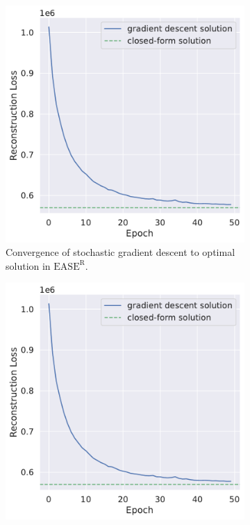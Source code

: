 \documentclass{article}
\newcommand{\easer}{$\text{EASE}^\text{R}$}
\begin{document}
\begin{figure}[h]
	\centering
	\begin{subfigure}[b]{0.3\textwidth}
		\centering
		\includegraphics[width=\textwidth]{figures/recon-loss.pdf}
		\caption{Convergence of stochastic gradient descent to optimal
			solution in \easer.}
		\label{fig:convergence}
	\end{subfigure}
	\begin{subfigure}[b]{0.3\textwidth}
		\centering
		\includegraphics[width=\textwidth]{figures/recon-loss.pdf}

\end{subfigure}
\end{figure}
\end{document}
